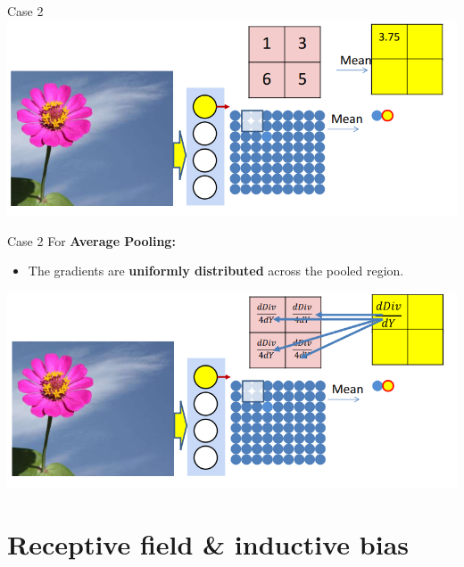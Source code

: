 \documentclass[default, aspectratio=169]{beamer}
\begin{document}
	\begin{frame}{Case 2}
		\centering
		\includegraphics[keepaspectratio, scale=0.7]{pic/pconv3.png}
	\end{frame}
	
	\begin{frame}{Case 2}
		For \textbf{Average Pooling:}
		\begin{itemize}
			\item The gradients are \textbf{uniformly distributed} across the pooled region.
		\end{itemize}
		\centering
		\includegraphics[keepaspectratio, scale=0.5]{pic/pconv4.png}
	\end{frame}
	
	
	
	\section{Receptive field \& inductive bias}
	
\end{document}
